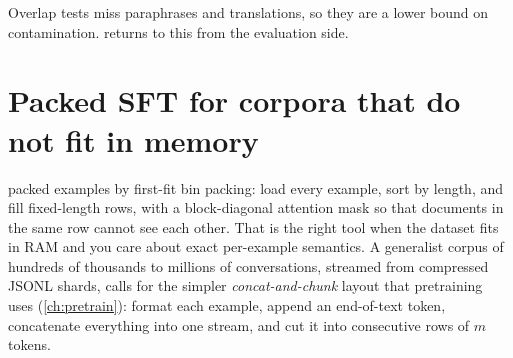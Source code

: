 Overlap tests miss paraphrases and translations, so they are a lower bound on contamination.
 returns to this from the evaluation side.

\section{Packed SFT for corpora that do not fit in memory}\label{sec:align:packing}


 packed examples by first-fit bin packing: load every example,
sort by length, and fill fixed-length rows, with a block-diagonal attention mask so that documents in the
same row cannot see each other. That is the right tool when the dataset fits in RAM and you
care about exact per-example semantics. A generalist corpus of hundreds of thousands to
millions of conversations, streamed from compressed JSONL shards, calls for the simpler
\emph{concat-and-chunk} layout that pretraining uses (\cref{ch:pretrain}): format each example,
append an end-of-text token, concatenate everything into one stream, and cut it into
consecutive rows of $m$ tokens.

